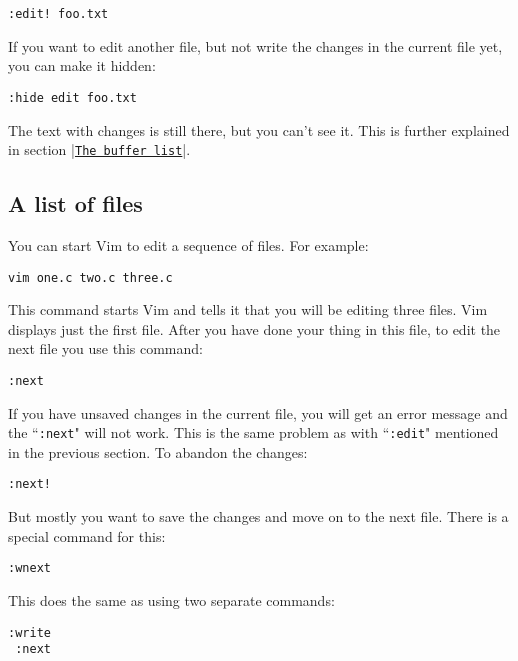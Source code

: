  \begin{Verbatim}[samepage=true]
 :edit! foo.txt
 \end{Verbatim}

If you want to edit another file, but not write the changes in the current file yet, you can make it hidden:

 \begin{Verbatim}[samepage=true]
 :hide edit foo.txt
 \end{Verbatim}

The text with changes is still there, but you can't see it.
This is further explained in section |\hyperref[The buffer list]{\texttt{The buffer list}}|.

\subsection{A list of files}
You can start Vim to edit a sequence of files.  For example:

 \begin{Verbatim}[samepage=true]
 vim one.c two.c three.c
 \end{Verbatim}

This command starts Vim and tells it that you will be editing three files.
Vim displays just the first file.
After you have done your thing in this file, to edit the next file you use this command:

 \begin{Verbatim}[samepage=true]
 :next
 \end{Verbatim}

If you have unsaved changes in the current file, you will get an error message and the ``\texttt{:next}" will not work.
This is the same problem as with ``\texttt{:edit}" mentioned in the previous section.
To abandon the changes:

 \begin{Verbatim}[samepage=true]
 :next!
 \end{Verbatim}

But mostly you want to save the changes and move on to the next file.
There is a special command for this:

 \begin{Verbatim}[samepage=true]
 :wnext
 \end{Verbatim}

This does the same as using two separate commands:

 \begin{Verbatim}[samepage=true]
 :write
 :next
 \end{Verbatim}

